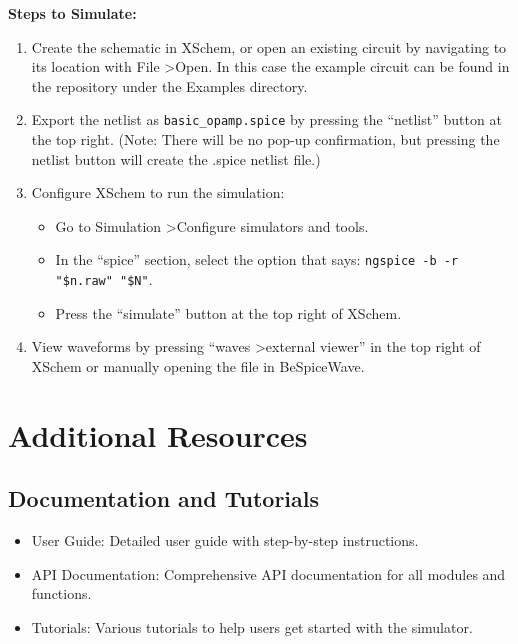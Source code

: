 \documentclass[12pt]{article}
\begin{document}
    \textbf{Steps to Simulate:}
    \begin{enumerate}
        \item Create the schematic in XSchem, or open an existing circuit by navigating to its location with File \textgreater Open.
        In this case the example circuit can be found in the repository under the Examples directory.
        \item Export the netlist as \texttt{basic\_opamp.spice} by pressing the ``netlist'' button at the top right.
        (Note: There will be no pop-up confirmation, but pressing the netlist button will create the .spice netlist file.)
        \item Configure XSchem to run the simulation:
        \begin{itemize}
            \item Go to Simulation \textgreater Configure simulators and tools.
            \item In the ``spice'' section, select the option that says: \texttt{ngspice -b -r "\$n.raw" "\$N"}.
            \item Press the ``simulate'' button at the top right of XSchem.
        \end{itemize}
        \item View waveforms by pressing ``waves \textgreater external viewer'' in the top right of XSchem or manually opening the file in BeSpiceWave.
    \end{enumerate}


    \section{Additional Resources}\label{sec:additional-resources}

    \subsection{Documentation and Tutorials}\label{subsec:documentation-and-tutorials}
    \begin{itemize}
        \item User Guide: Detailed user guide with step-by-step instructions.
        \item API Documentation: Comprehensive API documentation for all modules and functions.
        \item Tutorials: Various tutorials to help users get started with the simulator.
    \end{itemize}
\end{document}
